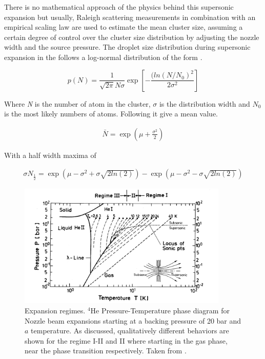 There is no mathematical approach of the physics behind this supersonic expansion but usually, Raleigh scattering measurements in combination with an empirical scaling law \cite{hagena_cluster_1972} are used to estimate the mean cluster size, assuming a certain degree of control over the cluster size distribution by adjusting the nozzle width and the source pressure. The droplet size distribution during supersonic expansion in the follows a log-normal distribution of the form \cite{harms_density_1998}.

\begin{equation}
p(N) = \frac{1}{\sqrt{2\pi}N \sigma} \exp  \left[- \frac{(ln(N/N_{0})^2}{2\sigma^2} \right]
\end{equation}

Where \textit{N} is the number of atom in the cluster, $\sigma$ is the distribution width and \textit{$N_{0}$} is the most likely numbers of atoms. Following it give a mean value.

\begin{align}
\bar N = \exp  \left(\mu+\frac{\sigma^2}{2} \right)
\end{align}

With a half width maxima of \cite{harms_density_1998}

\begin{align}
\sigma N_{\frac{1}{2}} = \exp \left( \mu - \sigma ^2 + \sigma \sqrt{2 ln(2)} \right) - \exp \left(  \mu - \sigma ^2 - \sigma \sqrt{2 ln(2)}  \right)
\end{align}

\begin{figure}[h!]
\centering
\includegraphics[width= 10cm]{../Images/expansion_regimes.PNG}
\caption[Phase diagram for Expansion regimens]{Expansion regimes. $^{4}$He Pressure-Temperature phase diagram for Nozzle beam expansions starting at a backing pressure  of 20 bar and $a$ temperature. As discussed, qualitatively different behaviors are shown for the regime I-II and II where starting in the gas phase,  near the phase transition respectively. Taken from \cite{buchenau_mass_1990}. }
\label{fig:ExpRegim}
\end{figure}

